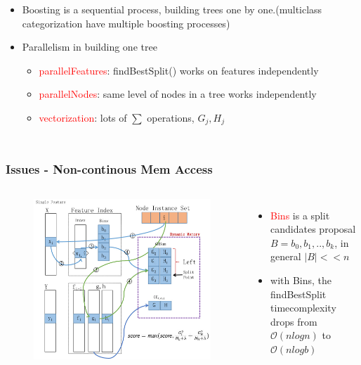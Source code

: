 \documentclass{beamer}
\begin{document}
\begin{frame}
\begin{columns}[c]
		\begin{itemize}
			\item Boosting is a sequential process, building trees one by one.(multiclass categorization have multiple boosting processes)
			\item Parallelism in building one tree
			\begin{itemize}			
				\item \textcolor{red}{parallelFeatures}: findBestSplit() works on features independently
				\item \textcolor{red}{parallelNodes}: same level of nodes in a tree works independently
				\item \textcolor{red}{vectorization}: lots of $\sum$ operations, $G_j, H_j$
			\end{itemize}			
		\end{itemize}
	\end{columns}	
\end{frame}

\begin{frame}
	\frametitle{Issues - Non-continous Mem Access}
	\begin{columns}[c] %
		\begin{figure}
			\includegraphics[width=1\linewidth]{figs/memaccess.jpg} 
		\end{figure}
		\begin{itemize}
			\item \textcolor{red}{Bins} is a split candidates proposal $B={b_0,b_1,..,b_k}$, in general $|B| << n$
			\item with Bins, the findBestSplit timecomplexity drops from $\mathcal{O}(nlogn)$ to $\mathcal{O}(nlogb)$ 
		\end{itemize}
	\end{columns}		
\end{frame}
\end{document}
